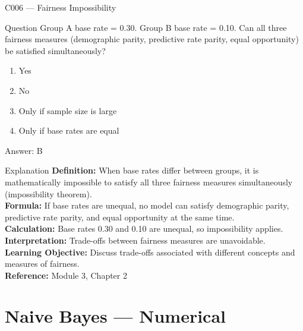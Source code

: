 \documentclass[aspectratio=169,8pt]{beamer}
\begin{document}
	\begin{frame}{C006 --- Fairness Impossibility}
		\begin{block}{Question}
			Group A base rate = 0.30. Group B base rate = 0.10. Can all three fairness measures (demographic parity, predictive rate parity, equal opportunity) be satisfied simultaneously?
			\begin{enumerate}
				\item Yes
				\item No
				\item Only if sample size is large
				\item Only if base rates are equal
			\end{enumerate}
		\end{block}
		\begin{exampleblock}{Answer: B}\end{exampleblock}
		\begin{block}{Explanation}
			\textbf{Definition:} When base rates differ between groups, it is mathematically impossible to satisfy all three fairness measures simultaneously (impossibility theorem).\\
			\textbf{Formula:} If base rates are unequal, no model can satisfy demographic parity, predictive rate parity, and equal opportunity at the same time.\\
			\textbf{Calculation:} Base rates 0.30 and 0.10 are unequal, so impossibility applies.\\
			\textbf{Interpretation:} Trade-offs between fairness measures are unavoidable.\\
			\textbf{Learning Objective:} Discuss trade-offs associated with different concepts and measures of fairness.\\
			\textbf{Reference:} Module 3, Chapter 2
		\end{block}
	\end{frame}
	
	\section{Naive Bayes --- Numerical}
	
\end{document}
